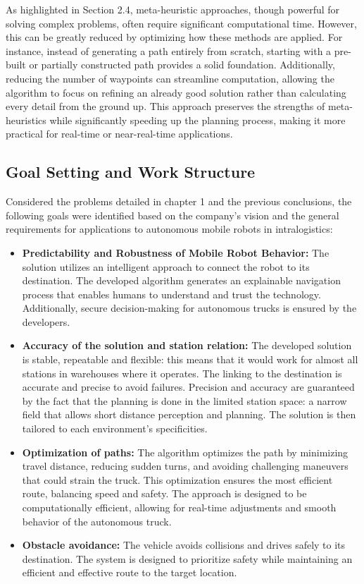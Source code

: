 As highlighted in Section 2.4, meta-heuristic approaches, though powerful for solving complex problems, 
often require significant computational time. However, this can be greatly reduced by optimizing how these 
methods are applied. For instance, instead of generating a path entirely from scratch, starting with a pre-built 
or partially constructed path provides a solid foundation. Additionally, reducing the number of waypoints 
can streamline computation, allowing the algorithm to focus on refining an already good solution rather 
than calculating every detail from the ground up. This approach preserves the strengths of meta-heuristics 
while significantly speeding up the planning process, making it more practical for real-time or near-real-time 
applications.


\subsection{Goal Setting and Work Structure}
Considered the problems detailed in chapter 1 and the previous conclusions, the following goals were identified 
based on the company's vision and the general requirements for applications to autonomous mobile robots in intralogistics:
\begin{itemize}
    \item \textbf{Predictability and Robustness of Mobile Robot Behavior: }The solution utilizes an intelligent approach to connect 
    the robot to its destination. The developed algorithm generates an explainable navigation process that enables humans 
    to understand and trust the technology. Additionally, secure decision-making for autonomous trucks is ensured by the 
    developers. 

    \item \textbf{Accuracy of the solution and station relation: }The developed solution is stable, repeatable and flexible: this 
    means that it would work for almost all stations in warehouses where it operates. The linking to the destination is 
    accurate and precise to avoid failures. Precision and accuracy are guaranteed by the fact that the planning is done 
    in the limited station space: a narrow field that allows short distance perception and planning. The solution is 
    then tailored to each environment's specificities. 
    
    \item \textbf{Optimization of paths: }The algorithm optimizes the path by minimizing travel distance, reducing sudden turns, and avoiding challenging maneuvers that could 
    strain the truck. This optimization ensures the most efficient route, balancing speed and safety. The approach is designed to be 
    computationally efficient, allowing for real-time adjustments and smooth behavior of the autonomous truck.

    \item \textbf{Obstacle avoidance: }The vehicle avoids collisions and drives safely to its destination. The system is designed to 
    prioritize safety while maintaining an efficient and effective route to the target location.

\end{itemize}

